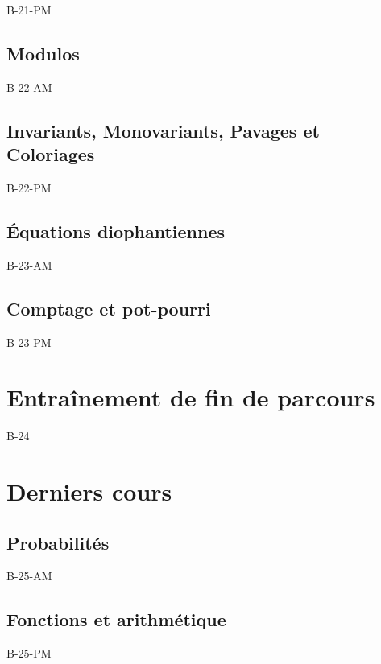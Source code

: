 \documentclass[poly,trombi]{valbonne}
\begin{document}
{B-21-PM}

\subsection{Modulos}
{B-22-AM}

\subsection{Invariants, Monovariants, Pavages et Coloriages}

{B-22-PM}

\subsection{Équations diophantiennes}

{B-23-AM}

\subsection{Comptage et pot-pourri}

{B-23-PM}


\section{Entraînement de fin de parcours}

{B-24}


\section{Derniers cours}

\subsection{Probabilités}

{B-25-AM}

\subsection{Fonctions et arithmétique}

{B-25-PM}



\end{document}
